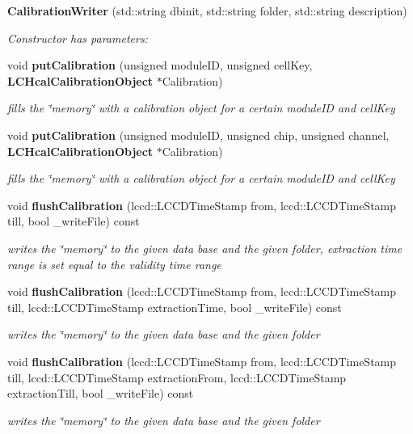 \begin{DoxyCompactItemize}
\item 
{\bf Calibration\-Writer} (std\-::string dbinit, std\-::string folder, std\-::string description)
\begin{DoxyCompactList}\small\item\em Constructor has parameters\-: \end{DoxyCompactList}\item 
void {\bf put\-Calibration} (unsigned module\-I\-D, unsigned cell\-Key, {\bf L\-C\-Hcal\-Calibration\-Object} $\ast$Calibration)
\begin{DoxyCompactList}\small\item\em fills the \char`\"{}memory\char`\"{} with a calibration object for a certain module\-I\-D and cell\-Key \end{DoxyCompactList}\item 
void {\bf put\-Calibration} (unsigned module\-I\-D, unsigned chip, unsigned channel, {\bf L\-C\-Hcal\-Calibration\-Object} $\ast$Calibration)
\begin{DoxyCompactList}\small\item\em fills the \char`\"{}memory\char`\"{} with a calibration object for a certain module\-I\-D and cell\-Key \end{DoxyCompactList}\item 
void {\bf flush\-Calibration} (lccd\-::\-L\-C\-C\-D\-Time\-Stamp from, lccd\-::\-L\-C\-C\-D\-Time\-Stamp till, bool \-\_\-write\-File) const 
\begin{DoxyCompactList}\small\item\em writes the \char`\"{}memory\char`\"{} to the given data base and the given folder, extraction time range is set equal to the validity time range \end{DoxyCompactList}\item 
void {\bf flush\-Calibration} (lccd\-::\-L\-C\-C\-D\-Time\-Stamp from, lccd\-::\-L\-C\-C\-D\-Time\-Stamp till, lccd\-::\-L\-C\-C\-D\-Time\-Stamp extraction\-Time, bool \-\_\-write\-File) const 
\begin{DoxyCompactList}\small\item\em writes the \char`\"{}memory\char`\"{} to the given data base and the given folder \end{DoxyCompactList}\item 
void {\bf flush\-Calibration} (lccd\-::\-L\-C\-C\-D\-Time\-Stamp from, lccd\-::\-L\-C\-C\-D\-Time\-Stamp till, lccd\-::\-L\-C\-C\-D\-Time\-Stamp extraction\-From, lccd\-::\-L\-C\-C\-D\-Time\-Stamp extraction\-Till, bool \-\_\-write\-File) const 
\begin{DoxyCompactList}\small\item\em writes the \char`\"{}memory\char`\"{} to the given data base and the given folder \end{DoxyCompactList}\end{DoxyCompactItemize}
